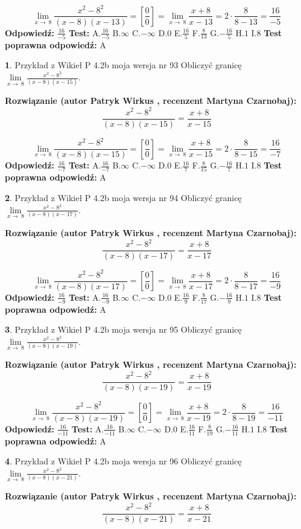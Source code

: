 \documentclass[12pt, a4paper]{article}
\theoremstyle{definition} %
\newtheorem{zad}{}
\newcommand{\zadStart}[1]{\begin{zad}#1\newline}
\newcommand{\zadStop}{\end{zad}}
\newcommand{\rozwStart}[2]{\noindent \textbf{Rozwiązanie (autor #1 , recenzent #2): }\newline}
\newcommand{\rozwStop}{\newline}
\newcommand{\odpStart}{\noindent \textbf{Odpowiedź:}\newline}
\newcommand{\odpStop}{\newline}
\newcommand{\testStart}{\noindent \textbf{Test:}\newline}
\newcommand{\testStop}{\newline}
\newcommand{\kluczStart}{\noindent \textbf{Test poprawna odpowiedź:}\newline}
\newcommand{\kluczStop}{\newline}
\begin{document}
$$\lim\limits_{x\to\ 8}\frac{x^{2}-8^{2}}{(x-8)(x-13)}=[\frac{0}{0}]=\lim\limits_{x\to\ 8}\frac{x+8}{x-13}=2 \cdot \frac{8}{8-13} = \frac{16}{-5}$$
\rozwStop
\odpStart
$\frac{16}{-5}$
\odpStop
\testStart
A.$\frac{16}{-5}$
B.$\infty$
C.$-\infty$
D.$0$
E.$\frac{16}{5}$
F.$\frac{8}{13}$
G.$-\frac{16}{5}$
H.$1$
I.$8$
\testStop
\kluczStart
A
\kluczStop



\zadStart{Przykład z Wikieł P 4.2b moja wersja nr 93}
Obliczyć granicę $\lim\limits_{x\to\ 8}\frac{x^{2}-8^{2}}{(x-8)(x-15)}$.
\zadStop
\rozwStart{Patryk Wirkus}{Martyna Czarnobaj}
$$\frac{x^{2}-8^{2}}{(x-8)(x-15)}=\frac{x+8}{x-15}$$

$$\lim\limits_{x\to\ 8}\frac{x^{2}-8^{2}}{(x-8)(x-15)}=[\frac{0}{0}]=\lim\limits_{x\to\ 8}\frac{x+8}{x-15}=2 \cdot \frac{8}{8-15} = \frac{16}{-7}$$
\rozwStop
\odpStart
$\frac{16}{-7}$
\odpStop
\testStart
A.$\frac{16}{-7}$
B.$\infty$
C.$-\infty$
D.$0$
E.$\frac{16}{7}$
F.$\frac{8}{15}$
G.$-\frac{16}{7}$
H.$1$
I.$8$
\testStop
\kluczStart
A
\kluczStop



\zadStart{Przykład z Wikieł P 4.2b moja wersja nr 94}
Obliczyć granicę $\lim\limits_{x\to\ 8}\frac{x^{2}-8^{2}}{(x-8)(x-17)}$.
\zadStop
\rozwStart{Patryk Wirkus}{Martyna Czarnobaj}
$$\frac{x^{2}-8^{2}}{(x-8)(x-17)}=\frac{x+8}{x-17}$$

$$\lim\limits_{x\to\ 8}\frac{x^{2}-8^{2}}{(x-8)(x-17)}=[\frac{0}{0}]=\lim\limits_{x\to\ 8}\frac{x+8}{x-17}=2 \cdot \frac{8}{8-17} = \frac{16}{-9}$$
\rozwStop
\odpStart
$\frac{16}{-9}$
\odpStop
\testStart
A.$\frac{16}{-9}$
B.$\infty$
C.$-\infty$
D.$0$
E.$\frac{16}{9}$
F.$\frac{8}{17}$
G.$-\frac{16}{9}$
H.$1$
I.$8$
\testStop
\kluczStart
A
\kluczStop



\zadStart{Przykład z Wikieł P 4.2b moja wersja nr 95}
Obliczyć granicę $\lim\limits_{x\to\ 8}\frac{x^{2}-8^{2}}{(x-8)(x-19)}$.
\zadStop
\rozwStart{Patryk Wirkus}{Martyna Czarnobaj}
$$\frac{x^{2}-8^{2}}{(x-8)(x-19)}=\frac{x+8}{x-19}$$

$$\lim\limits_{x\to\ 8}\frac{x^{2}-8^{2}}{(x-8)(x-19)}=[\frac{0}{0}]=\lim\limits_{x\to\ 8}\frac{x+8}{x-19}=2 \cdot \frac{8}{8-19} = \frac{16}{-11}$$
\rozwStop
\odpStart
$\frac{16}{-11}$
\odpStop
\testStart
A.$\frac{16}{-11}$
B.$\infty$
C.$-\infty$
D.$0$
E.$\frac{16}{11}$
F.$\frac{8}{19}$
G.$-\frac{16}{11}$
H.$1$
I.$8$
\testStop
\kluczStart
A
\kluczStop



\zadStart{Przykład z Wikieł P 4.2b moja wersja nr 96}
Obliczyć granicę $\lim\limits_{x\to\ 8}\frac{x^{2}-8^{2}}{(x-8)(x-21)}$.
\zadStop
\rozwStart{Patryk Wirkus}{Martyna Czarnobaj}
$$\frac{x^{2}-8^{2}}{(x-8)(x-21)}=\frac{x+8}{x-21}$$
\end{document}
